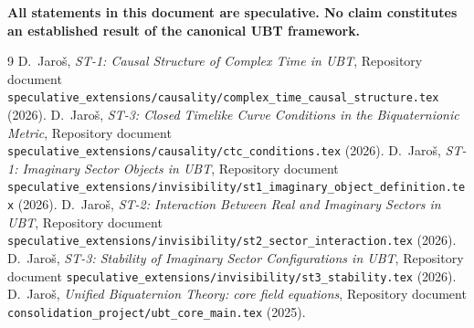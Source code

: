 \documentclass[12pt]{article}
\begin{document}
\medskip
\noindent\textbf{All statements in this document are speculative.
No claim constitutes an established result of the canonical UBT framework.}


\begin{thebibliography}{9}
  D.~Jaroš,
  \emph{ST-1: Causal Structure of Complex Time in UBT},
  Repository document
  \texttt{speculative\_extensions/causality/complex\_time\_causal\_structure.tex}
  (2026).
  D.~Jaroš,
  \emph{ST-3: Closed Timelike Curve Conditions in the Biquaternionic Metric},
  Repository document \texttt{speculative\_extensions/causality/ctc\_conditions.tex}
  (2026).
  D.~Jaroš,
  \emph{ST-1: Imaginary Sector Objects in UBT},
  Repository document
  \texttt{speculative\_extensions/invisibility/st1\_imaginary\_object\_definition.tex}
  (2026).
  D.~Jaroš,
  \emph{ST-2: Interaction Between Real and Imaginary Sectors in UBT},
  Repository document
  \texttt{speculative\_extensions/invisibility/st2\_sector\_interaction.tex}
  (2026).
  D.~Jaroš,
  \emph{ST-3: Stability of Imaginary Sector Configurations in UBT},
  Repository document
  \texttt{speculative\_extensions/invisibility/st3\_stability.tex}
  (2026).
  D.~Jaroš,
  \emph{Unified Biquaternion Theory: core field equations},
  Repository document \texttt{consolidation\_project/ubt\_core\_main.tex} (2025).
\end{thebibliography}
\end{document}
